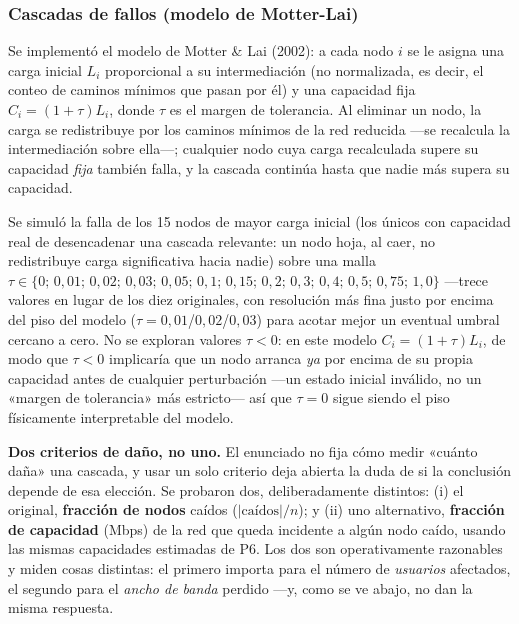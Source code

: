 \documentclass[10pt,a4paper]{extarticle}
\begin{document}
\subsubsection{Cascadas de fallos (modelo de Motter-Lai)}

Se implementó el modelo de Motter \& Lai (2002): a cada nodo $i$ se le asigna una carga
inicial $L_i$ proporcional a su intermediación (no normalizada, es decir, el conteo de
caminos mínimos que pasan por él) y una capacidad fija $C_i = (1+\tau)L_i$, donde $\tau$ es
el margen de tolerancia. Al eliminar un nodo, la carga se redistribuye por los caminos
mínimos de la red reducida ---se recalcula la intermediación sobre ella---; cualquier nodo
cuya carga recalculada supere su capacidad \textit{fija} también falla, y la cascada
continúa hasta que nadie más supera su capacidad.

Se simuló la falla de los 15 nodos de mayor carga inicial (los únicos con capacidad real de
desencadenar una cascada relevante: un nodo hoja, al caer, no redistribuye carga
significativa hacia nadie) sobre una malla $\tau \in \{0;\, 0{,}01;\, 0{,}02;\, 0{,}03;\,
0{,}05;\, 0{,}1;\, 0{,}15;\, 0{,}2;\, 0{,}3;\, 0{,}4;\, 0{,}5;\, 0{,}75;\, 1{,}0\}$ ---trece
valores en lugar de los diez originales, con resolución más fina justo por encima del piso
del modelo ($\tau=0{,}01$/$0{,}02$/$0{,}03$) para acotar mejor un eventual umbral cercano a
cero. No se exploran valores $\tau<0$: en este modelo $C_i=(1+\tau)L_i$, de modo que
$\tau<0$ implicaría que un nodo arranca \textit{ya} por encima de su propia capacidad antes
de cualquier perturbación ---un estado inicial inválido, no un «margen de tolerancia» más
estricto--- así que $\tau=0$ sigue siendo el piso físicamente interpretable del modelo.

\textbf{Dos criterios de daño, no uno.} El enunciado no fija cómo medir «cuánto daña» una
cascada, y usar un solo criterio deja abierta la duda de si la conclusión depende de esa
elección. Se probaron dos, deliberadamente distintos: (i) el original, \textbf{fracción de
nodos} caídos ($|\text{caídos}|/n$); y (ii) uno alternativo, \textbf{fracción de capacidad}
(Mbps) de la red que queda incidente a algún nodo caído, usando las mismas capacidades
estimadas de P6. Los dos son operativamente razonables y miden cosas distintas: el primero
importa para el número de \textit{usuarios} afectados, el segundo para el \textit{ancho de
banda} perdido ---y, como se ve abajo, no dan la misma respuesta.
\end{document}
